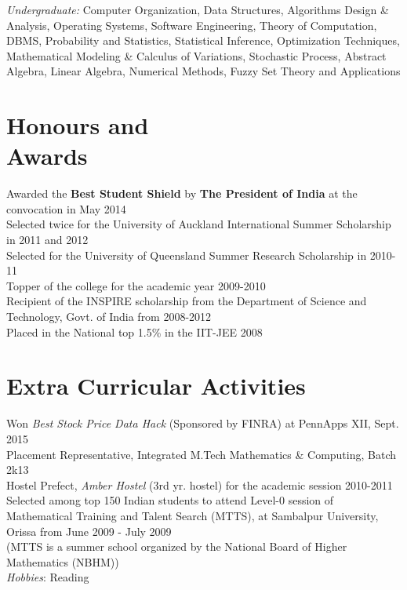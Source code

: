 \documentclass[margin,line]{resume}
\begin{document}
\begin{resume}
   		\textit{Undergraduate: }Computer Organization,  Data Structures, Algorithms Design \& Analysis, Operating Systems, Software Engineering, Theory of Computation, DBMS, Probability and Statistics, Statistical Inference, Optimization Techniques, Mathematical Modeling \& Calculus of Variations, Stochastic Process, Abstract Algebra, Linear  Algebra, Numerical Methods, Fuzzy Set Theory and Applications


\section{\mysidestyle Honours and \\Awards}
			 Awarded the \textbf{Best Student Shield} by \textbf{The President of India} at the convocation in May 2014\vspace{2mm}
			 \\Selected twice for the University of Auckland International Summer Scholarship in 2011 and 2012 \vspace{2mm}
			 \\Selected for the University of Queensland Summer Research Scholarship in 2010-11\vspace{2mm}
			 \\Topper of the college for the academic year 2009-2010\vspace{2mm}
			 \\Recipient of the INSPIRE scholarship from the Department of Science and Technology, Govt. of India from 2008-2012\vspace{2mm}
			 \\Placed in the National top 1.5\% in the IIT-JEE 2008 \vspace{2mm}

\section{\mysidestyle Extra Curricular Activities}
		Won \textit{Best Stock Price Data Hack} (Sponsored by FINRA) at PennApps XII, Sept. 2015\vspace{2mm}
		\\Placement Representative, Integrated M.Tech Mathematics \& Computing, Batch 2k13\vspace{2mm}
		\\Hostel Prefect, \textsl{Amber Hostel} (3rd yr. hostel) for the academic session 2010-2011\vspace{2mm}
		\\Selected among top 150 Indian students to attend Level-0 session of Mathematical Training and Talent Search (MTTS), at Sambalpur University, Orissa from June 2009 - July 2009
		\\(MTTS is a summer school organized by the National Board of Higher Mathematics (NBHM))\vspace{2mm}
		\\\textsl{Hobbies}: Reading

\end{resume}
\end{document}
